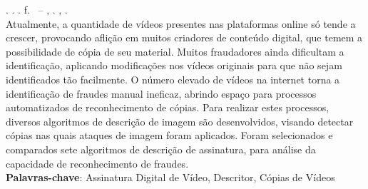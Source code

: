 
\begin{resumo}[RESUMO]
\begin{SingleSpacing}

\imprimirautorcitacao. \imprimirtitulo. \imprimirdata. \pageref {LastPage} f. \imprimirprojeto\ – \imprimirprograma, \imprimirinstituicao. \imprimirlocal, \imprimirdata.\\

Atualmente, a quantidade de vídeos presentes nas plataformas online só tende a crescer, provocando aflição em muitos criadores de conteúdo digital, que temem a possibilidade de cópia de seu material.  Muitos fraudadores ainda dificultam a identificação, aplicando modificações nos vídeos originais para que não sejam identificados tão facilmente. O número elevado de vídeos na internet torna a identificação de fraudes manual ineficaz, abrindo espaço para processos automatizados de reconhecimento de cópias. Para realizar estes processos, diversos algoritmos de descrição de imagem são desenvolvidos, visando detectar cópias nas quais ataques de imagem foram aplicados. Foram selecionados e comparados sete algoritmos de descrição de assinatura, para análise da capacidade de reconhecimento de fraudes. \\

\textbf{Palavras-chave}: Assinatura Digital de Vídeo, Descritor, Cópias de Vídeos

\end{SingleSpacing}
\end{resumo}


